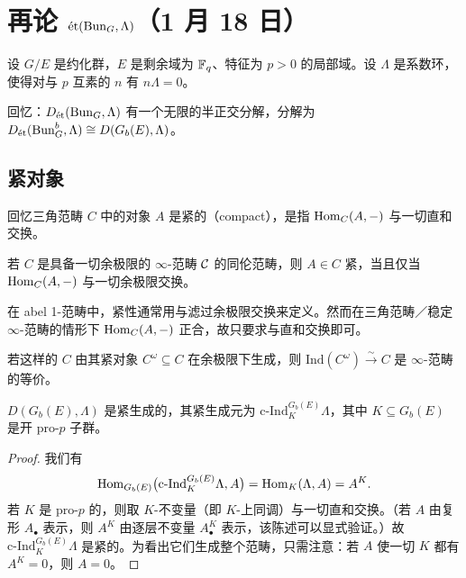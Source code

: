 \section[再论 $\et(\Bun_G,\Lam)$]{再论 $\et(\Bun_G,\Lam)$（1 月 18 日）}



设 $G/E$ 是约化群，$E$ 是剩余域为 $\Fq$、特征为 $p>0$ 的局部域。设 $\Lambda$ 是系数环，使得对与 $p$ 互素的 $n$ 有 $n\Lambda=0$。

回忆：$D_{\et}(\Bun_G,\Lambda)$ 有一个无限的半正交分解，分解为 $D_{\et}(\Bun^b_G,\Lambda)\cong D(G_b(E),\Lambda)$。

\subsection{紧对象}

回忆三角范畴 $C$ 中的对象 $A$ 是紧的（compact），是指 $\Hom_C(A,-)$ 与一切直和交换。

\begin{fact}
若 $C$ 是具备一切余极限的 $\infty$-范畴 $\cC$ 的同伦范畴，则 $A\in C$ 紧，当且仅当 $\Hom_C(A,-)$ 与一切余极限交换。
\end{fact}

\begin{remark}
在 abel 1-范畴中，紧性通常用与滤过余极限交换来定义。然而在三角范畴／稳定 $\infty$-范畴的情形下 $\Hom_C(A,-)$ 正合，故只要求与直和交换即可。
\end{remark}

\begin{fact}
若这样的 $C$ 由其紧对象 $C^\omega\subseteq C$ 在余极限下生成，则 $\mathrm{Ind}(C^\omega)\xrightarrow{\ \sim\ }C$ 是 $\infty$-范畴的等价。
\end{fact}

\begin{proposition}
$D(G_b(E),\Lambda)$ 是紧生成的，其紧生成元为 $\mathrm{c}\text{-}\mathrm{Ind}^{G_b(E)}_K\Lambda$，其中 $K\subseteq G_b(E)$ 是开 pro-$p$ 子群。
\end{proposition}

\begin{proof}
我们有
\[
\Hom_{G_b(E)}\bigl(\mathrm{c}\text{-}\mathrm{Ind}^{G_b(E)}_K\Lambda,A\bigr)=\Hom_K(\Lambda,A)=A^K.
\]
若 $K$ 是 pro-$p$ 的，则取 $K$-不变量（即 $K$-上同调）与一切直和交换。（若 $A$ 由复形 $A_\bullet$ 表示，则 $A^K$ 由逐层不变量 $A_\bullet^K$ 表示，该陈述可以显式验证。）故 $\mathrm{c}\text{-}\mathrm{Ind}^{G_b(E)}_K\Lambda$ 是紧的。为看出它们生成整个范畴，只需注意：若 $A$ 使一切 $K$ 都有 $A^K=0$，则 $A=0$。
\end{proof}

